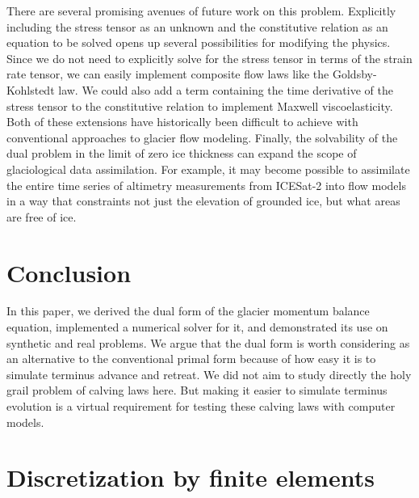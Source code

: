 \documentclass{article}
\theoremstyle{definition}
\theoremstyle{plain}
\begin{document}
There are several promising avenues of future work on this problem.
Explicitly including the stress tensor as an unknown and the constitutive relation as an equation to be solved opens up several possibilities for modifying the physics.
Since we do not need to explicitly solve for the stress tensor in terms of the strain rate tensor, we can easily implement composite flow laws like the Goldsby-Kohlstedt law.
We could also add a term containing the time derivative of the stress tensor to the constitutive relation to implement Maxwell viscoelasticity.
Both of these extensions have historically been difficult to achieve with conventional approaches to glacier flow modeling.
Finally, the solvability of the dual problem in the limit of zero ice thickness can expand the scope of glaciological data assimilation.
For example, it may become possible to assimilate the entire time series of altimetry measurements from ICESat-2 into flow models in a way that constraints not just the elevation of grounded ice, but what areas are free of ice.


\section{Conclusion}

In this paper, we derived the dual form of the glacier momentum balance equation, implemented a numerical solver for it, and demonstrated its use on synthetic and real problems.
We argue that the dual form is worth considering as an alternative to the conventional primal form because of how easy it is to simulate terminus advance and retreat.
We did not aim to study directly the holy grail problem of calving laws here.
But making it easier to simulate terminus evolution is a virtual requirement for testing these calving laws with computer models.



\appendix

\section{Discretization by finite elements}
\label{app:discretization}
\end{document}
